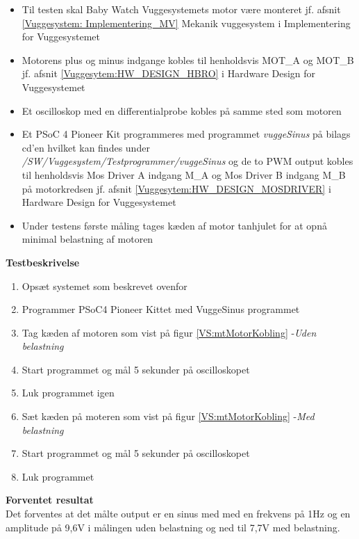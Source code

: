 \begin{itemize}
	\item Til testen skal Baby Watch Vuggesystemets motor være monteret jf. afsnit \vref{Vuggesystem: Implementering_MV} Mekanik vuggesystem i Implementering for Vuggesystemet
	\item Motorens plus og minus indgange kobles til henholdsvis MOT\_A og MOT\_B jf. afsnit \vref{Vuggesytem:HW_DESIGN_HBRO} i Hardware Design for Vuggesystemet
	\item Et oscilloskop med en differentialprobe kobles på samme sted som motoren
	\item Et PSoC 4 Pioneer Kit \citep{website:Cypress} programmeres med programmet \textit{vuggeSinus} på bilags cd'en \citep{cd} hvilket kan findes under \textit{/SW/Vuggesystem/Testprogrammer/vuggeSinus} og de to PWM output kobles til henholdsvis Mos Driver A indgang M\_A og Mos Driver B indgang M\_B på motorkredsen jf. afsnit \vref{Vuggesytem:HW_DESIGN_MOSDRIVER} i Hardware Design for Vuggesystemet
	\item Under testens første måling tages kæden af motor tanhjulet for at opnå minimal belastning af motoren
\end{itemize} 


\textbf{Testbeskrivelse}
\begin{enumerate}
	\item Opsæt systemet som beskrevet ovenfor
	\item Programmer PSoC4 Pioneer Kittet med VuggeSinus programmet
	\item Tag kæden af motoren som vist på figur \ref{VS:mtMotorKobling} -\textit{Uden belastning}
	\item Start programmet og mål 5 sekunder på oscilloskopet
	\item Luk programmet igen
	\item Sæt kæden på moteren som vist på figur \ref{VS:mtMotorKobling} -\textit{Med belastning}
	\item Start programmet og mål 5 sekunder på oscilloskopet
	\item Luk programmet
	
\end{enumerate}

\textbf{Forventet resultat} \\
Det forventes at det målte output er en sinus med med en frekvens på 1Hz og en amplitude på 9,6V i målingen uden belastning og ned til 7,7V med belastning.

